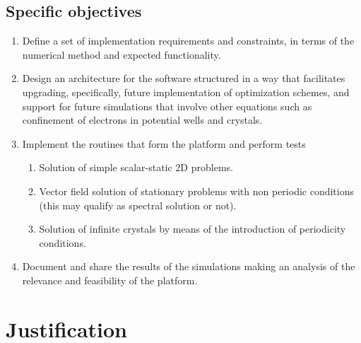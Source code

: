 \subsection{Specific objectives}
\begin{enumerate}
\item Define a set of implementation requirements and constraints, in terms of the numerical method\remove[SEC]{,} and expected functionality.  
\item Design an architecture for the software structured in a way that facilitates upgrading, specifically, future implementation of optimization schemes, and support for future simulations that involve other equations such as confinement of electrons in potential wells and crystals.
\item Implement the routines that form the platform and perform tests   
	\begin{enumerate}
	\item Solution of simple scalar-static 2D problems.
	\item Vector field solution of stationary problems with non periodic conditions (this may qualify as spectral solution or not).
	\item Solution of infinite crystals by means of the introduction of periodicity conditions.
	\end{enumerate}

\item Document and share the results of the simulations making an analysis of the relevance and feasibility of the platform. 
\end{enumerate}

\section{Justification}

